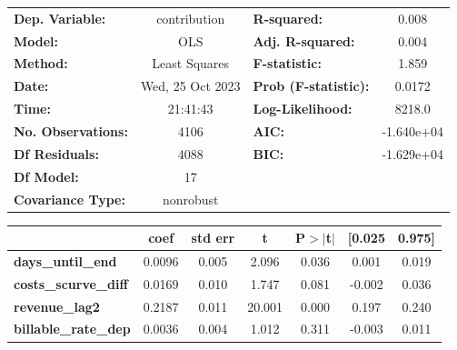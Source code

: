 \begin{center}
\begin{tabular}{lclc}
\toprule
\textbf{Dep. Variable:}                     &   contribution   & \textbf{  R-squared:         } &     0.008   \\
\textbf{Model:}                             &       OLS        & \textbf{  Adj. R-squared:    } &     0.004   \\
\textbf{Method:}                            &  Least Squares   & \textbf{  F-statistic:       } &     1.859   \\
\textbf{Date:}                              & Wed, 25 Oct 2023 & \textbf{  Prob (F-statistic):} &   0.0172    \\
\textbf{Time:}                              &     21:41:43     & \textbf{  Log-Likelihood:    } &    8218.0   \\
\textbf{No. Observations:}                  &        4106      & \textbf{  AIC:               } & -1.640e+04  \\
\textbf{Df Residuals:}                      &        4088      & \textbf{  BIC:               } & -1.629e+04  \\
\textbf{Df Model:}                          &          17      & \textbf{                     } &             \\
\textbf{Covariance Type:}                   &    nonrobust     & \textbf{                     } &             \\
\bottomrule
\end{tabular}
\begin{tabular}{lcccccc}
                                            & \textbf{coef} & \textbf{std err} & \textbf{t} & \textbf{P$> |$t$|$} & \textbf{[0.025} & \textbf{0.975]}  \\
\midrule
\textbf{days\_until\_end}                   &       0.0096  &        0.005     &     2.096  &         0.036        &        0.001    &        0.019     \\
\textbf{costs\_scurve\_diff}                &       0.0169  &        0.010     &     1.747  &         0.081        &       -0.002    &        0.036     \\
\textbf{revenue\_lag2}                      &       0.2187  &        0.011     &    20.001  &         0.000        &        0.197    &        0.240     \\
\textbf{billable\_rate\_dep}                &       0.0036  &        0.004     &     1.012  &         0.311        &       -0.003    &        0.011     \\

\end{tabular}
\end{center}
